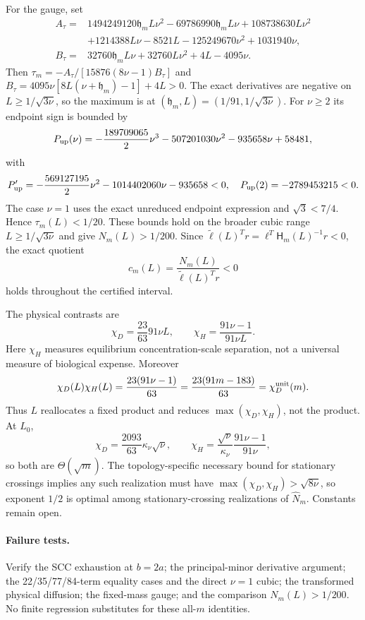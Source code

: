 \documentclass[10pt]{article}
\begin{document}
For the gauge, set
\begin{align*}
A_\tau={}&1494249120\mathfrak h_mL\nu^2-69786990\mathfrak h_mL\nu
+108738630L\nu^2\\
&+1214388L\nu-8521L-125249670\nu^2+1031940\nu,\\
B_\tau={}&32760\mathfrak h_mL\nu+32760L\nu^2+4L-4095\nu.
\end{align*}
Then $\tau_m=-A_\tau/[15876(8\nu-1)B_\tau]$ and
$B_\tau=4095\nu[8L(\nu+\mathfrak h_m)-1]+4L>0$.  The exact derivatives
are negative on $L\ge1/\sqrt{3\nu}$, so the maximum is at
$(\mathfrak h_m,L)=(1/91,1/\sqrt{3\nu})$.  For $\nu\ge2$ its endpoint sign
is bounded by
\[
P_{\rm up}(\nu)=-\frac{189709065}{2}\nu^3-507201030\nu^2-935658\nu+58481,
\]
with
\[
P_{\rm up}'=-\frac{569127195}{2}\nu^2-1014402060\nu-935658<0,
\quad P_{\rm up}(2)=-2789453215<0.
\]
The case $\nu=1$ uses the exact unreduced endpoint expression and
$\sqrt3<7/4$.  Hence $\tau_m(L)<1/20$.  These bounds hold on the broader
cubic range $L\ge1/\sqrt{3\nu}$ and give
$N_m(L)>1/200$.  Since $\widetilde\ell(L)^Tr
=\ell^T\mathsf H_m(L)^{-1}r<0$, the exact quotient
\[
c_m(L)=\frac{N_m(L)}{\widetilde\ell(L)^Tr}<0
\]
holds throughout the certified interval.

The physical contrasts are
\[
\chi_D=\frac{23}{63}91\nu L,\qquad
\chi_H=\frac{91\nu-1}{91\nu L}.
\]
Here $\chi_H$ measures equilibrium concentration-scale separation, not a
universal measure of biological expense.  Moreover
\[
\chi_D(L)\chi_H(L)=\frac{23(91\nu-1)}{63}
=\frac{23(91m-183)}{63}=\chi_D^{\rm unit}(m).
\]
Thus $L$ reallocates a fixed product and reduces
$\max(\chi_D,\chi_H)$, not the product.
At $L_0$,
\[
 \chi_D=\frac{2093}{63}\kappa_\nu\sqrt\nu,
 \qquad
 \chi_H=\frac{\sqrt\nu}{\kappa_\nu}\frac{91\nu-1}{91\nu},
\]
so both are $\Theta(\sqrt m)$. The topology-specific necessary bound for
stationary crossings implies any such realization must have
$\max(\chi_D,\chi_H)>\sqrt{8\nu}$, so exponent $1/2$ is optimal among
stationary-crossing realizations of $\widehat N_m$. Constants remain open.

\paragraph{Failure tests.} Verify the SCC exhaustion at $b=2a$; the
principal-minor derivative argument; the 22/35/77/84-term equality cases and
the direct $\nu=1$ cubic; the transformed physical diffusion; the fixed-mass
gauge; and the comparison $N_m(L)>1/200$. No finite regression substitutes
for these all-$m$ identities.
\end{document}
